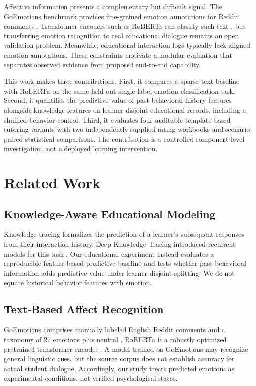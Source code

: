 \documentclass[conference]{IEEEtran}
\begin{document}
Affective information presents a complementary but difficult signal. The GoEmotions benchmark provides fine-grained emotion annotations for Reddit comments \cite{demszky2020}. Transformer encoders such as RoBERTa can classify such text \cite{liu2019}, but transferring emotion recognition to real educational dialogue remains an open validation problem. Meanwhile, educational interaction logs typically lack aligned emotion annotations. These constraints motivate a modular evaluation that separates observed evidence from proposed end-to-end capability.

This work makes three contributions. First, it compares a sparse-text baseline with RoBERTa on the same held-out single-label emotion classification task. Second, it quantifies the predictive value of past behavioral-history features alongside knowledge features on learner-disjoint educational records, including a shuffled-behavior control. Third, it evaluates four auditable template-based tutoring variants with two independently supplied rating workbooks and scenario-paired statistical comparisons. The contribution is a controlled component-level investigation, not a deployed learning intervention.

\section{Related Work}
\subsection{Knowledge-Aware Educational Modeling}
Knowledge tracing formalizes the prediction of a learner's subsequent responses from their interaction history. Deep Knowledge Tracing introduced recurrent models for this task \cite{piech2015}. Our educational experiment instead evaluates a reproducible feature-based predictive baseline and tests whether past behavioral information adds predictive value under learner-disjoint splitting. We do not equate historical behavior features with emotion.
\subsection{Text-Based Affect Recognition}
GoEmotions comprises manually labeled English Reddit comments and a taxonomy of 27 emotions plus neutral \cite{demszky2020}. RoBERTa is a robustly optimized pretrained transformer encoder \cite{liu2019}. A model trained on GoEmotions may recognize general linguistic cues, but the source corpus does not establish accuracy for actual student dialogue. Accordingly, our study treats predicted emotions as experimental conditions, not verified psychological states.
\end{document}
